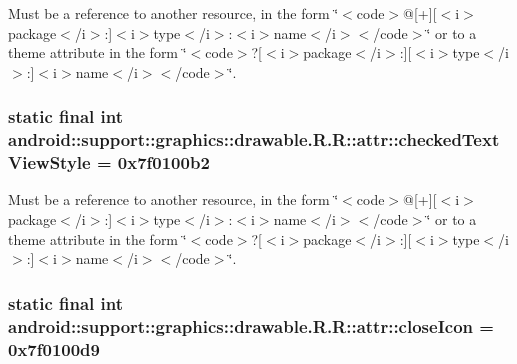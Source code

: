 Must be a reference to another resource, in the form \char`\"{}$<$code$>$@\mbox{[}+\mbox{]}\mbox{[}$<$i$>$package$<$/i$>$:\mbox{]}$<$i$>$type$<$/i$>$:$<$i$>$name$<$/i$>$$<$/code$>$\char`\"{} or to a theme attribute in the form \char`\"{}$<$code$>$?\mbox{[}$<$i$>$package$<$/i$>$:\mbox{]}\mbox{[}$<$i$>$type$<$/i$>$:\mbox{]}$<$i$>$name$<$/i$>$$<$/code$>$\char`\"{}. \hypertarget{classandroid_1_1support_1_1graphics_1_1drawable_1_1_r_1_1attr_aa9e2c0a00abba70b5a5348b6ecd32f7}{
\subsubsection[{checkedTextViewStyle}]{\setlength{\rightskip}{0pt plus 5cm}static final int android::support::graphics::drawable.R.R::attr::checkedTextViewStyle = 0x7f0100b2}}
\label{classandroid_1_1support_1_1graphics_1_1drawable_1_1_r_1_1attr_aa9e2c0a00abba70b5a5348b6ecd32f7}


Must be a reference to another resource, in the form \char`\"{}$<$code$>$@\mbox{[}+\mbox{]}\mbox{[}$<$i$>$package$<$/i$>$:\mbox{]}$<$i$>$type$<$/i$>$:$<$i$>$name$<$/i$>$$<$/code$>$\char`\"{} or to a theme attribute in the form \char`\"{}$<$code$>$?\mbox{[}$<$i$>$package$<$/i$>$:\mbox{]}\mbox{[}$<$i$>$type$<$/i$>$:\mbox{]}$<$i$>$name$<$/i$>$$<$/code$>$\char`\"{}. \hypertarget{classandroid_1_1support_1_1graphics_1_1drawable_1_1_r_1_1attr_83548829fa96b41f5e13efab7854bab3}{
\subsubsection[{closeIcon}]{\setlength{\rightskip}{0pt plus 5cm}static final int android::support::graphics::drawable.R.R::attr::closeIcon = 0x7f0100d9}}
\label{classandroid_1_1support_1_1graphics_1_1drawable_1_1_r_1_1attr_83548829fa96b41f5e13efab7854bab3}



